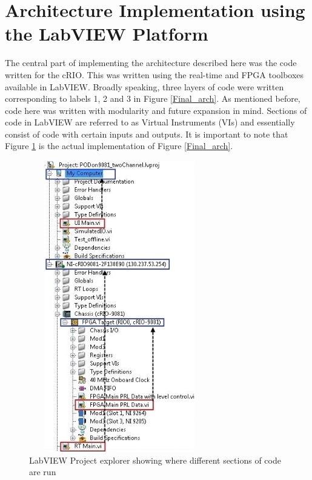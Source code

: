 \documentclass[conference]{IEEEtran}
\begin{document}
\section{Architecture Implementation using the LabVIEW Platform} \label{HILtest}
The central part of implementing the architecture described here was the code written for the cRIO. This was written using the real-time and FPGA toolboxes available in LabVIEW\cite{cRIO9081}. Broadly speaking, three layers of code were written corresponding to labels 1, 2 and 3 in Figure \ref{Final_arch}. As mentioned before, code here was written with modularity and future expansion in mind. Sections of code in LabVIEW are referred to as Virtual Instruments (VIs) and essentially consist of code with certain inputs and outputs\cite{cRIO9081}. It is important to note that Figure \ref{Two_area} is the actual implementation of Figure \ref{Final_arch}.
\begin{figure}[h]
\centering
\includegraphics[width=3.1in,height=5in]{LabVIEWProj.JPG} 
\caption{LabVIEW Project explorer showing where different sections of code are run}
\label{Two_area}
\end{figure}
\end{document}
